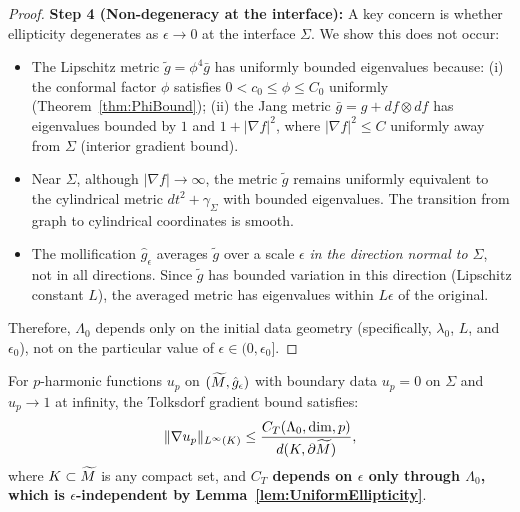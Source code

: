 \begin{proof}
\textbf{Step 4 (Non-degeneracy at the interface):} A key concern is whether ellipticity degenerates as $\epsilon \to 0$ at the interface $\Sigma$. We show this does not occur:
\begin{itemize}
    \item The Lipschitz metric $\tilde{g} = \phi^4 \bar{g}$ has uniformly bounded eigenvalues because: (i) the conformal factor $\phi$ satisfies $0 < c_0 \le \phi \le C_0$ uniformly (Theorem~\ref{thm:PhiBound}); (ii) the Jang metric $\bar{g} = g + df \otimes df$ has eigenvalues bounded by $1$ and $1 + |\nabla f|^2$, where $|\nabla f|^2 \le C$ uniformly away from $\Sigma$ (interior gradient bound).
    \item Near $\Sigma$, although $|\nabla f| \to \infty$, the metric $\tilde{g}$ remains uniformly equivalent to the cylindrical metric $dt^2 + \gamma_\Sigma$ with bounded eigenvalues. The transition from graph to cylindrical coordinates is smooth.
    \item The mollification $\hat{g}_\epsilon$ averages $\tilde{g}$ over a scale $\epsilon$ \emph{in the direction normal to $\Sigma$}, not in all directions. Since $\tilde{g}$ has bounded variation in this direction (Lipschitz constant $L$), the averaged metric has eigenvalues within $L\epsilon$ of the original.
\end{itemize}
Therefore, $\Lambda_0$ depends only on the initial data geometry (specifically, $\lambda_0$, $L$, and $\epsilon_0$), not on the particular value of $\epsilon \in (0, \epsilon_0]$.
\end{proof}

\begin{lemma}\label{lem:TolksdorfIndependence}
For $p$-harmonic functions $u_p$ on $(\widetilde{M}, \hat{g}_\epsilon)$ with boundary data $u_p = 0$ on $\Sigma$ and $u_p \to 1$ at infinity, the Tolksdorf gradient bound satisfies:
\begin{equation}
    \|\nabla u_p\|_{L^\infty(K)} \le \frac{C_T(\Lambda_0, \dim, p)}{d(K, \partial \widetilde{M})},
\end{equation}
where $K \subset \widetilde{M}$ is any compact set, and \textbf{$C_T$ depends on $\epsilon$ only through $\Lambda_0$, which is $\epsilon$-independent by Lemma~\ref{lem:UniformEllipticity}}.
\end{lemma}

